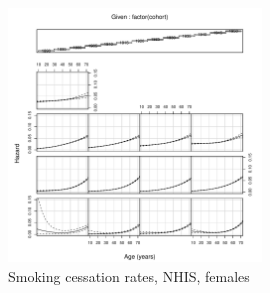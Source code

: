 \documentclass[11pt,a4paper]{article}
\begin{document}
\begin{figure}[ht]
  \centering
  \includegraphics[width=0.6\textwidth]{coplot-4.pdf}    
  \caption{Smoking cessation rates, NHIS, females}
  \label{fig:cess-females}
\end{figure}




% 
\end{document}
